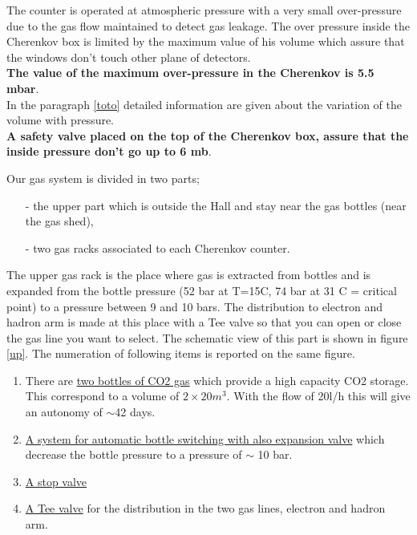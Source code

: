 \documentclass[12pt]{article}
\begin{document}

The counter is operated at atmospheric pressure with a very small
over-pressure due to the gas flow maintained to detect gas leakage. 
The over pressure inside the Cherenkov box is limited by the maximum value
of his volume which assure that the windows don't touch other plane
of detectors.\\ 
{\bf The value of the maximum over-pressure in the Cherenkov is 5.5 mbar}.\\
In the paragraph \ref{toto} detailed information are given about the
 variation of the volume with pressure.\\
{\bf A safety valve placed on the top of the
Cherenkov box, assure that the inside pressure don't go up to 6 mb}.

\label{upi}
Our gas system is divided in two parts; 
\begin{itemize}
\item[-] the upper part which is outside the Hall and stay near the gas 
bottles (near the gas shed),
\item[-] two gas racks associated to each Cherenkov counter.
\end{itemize}
The upper gas rack is the place where gas is extracted from bottles and is
 expanded from the bottle pressure (52 bar at T=15C, 74 bar at 31 C 
= critical point) to a pressure between 9 and 10 bars. The distribution to 
electron and hadron arm is made at this place with a Tee valve so that you
can open or close the gas line you want to select. The schematic view of this
part is shown  in figure \ref{up}. The numeration of following items is 
reported on the same figure.
\begin{enumerate}
\item There are \underline{two bottles of CO2 gas} 
which provide a high capacity CO2 storage. This correspond to a volume 
of $2\times 20m^3$. With the flow of 20l/h  this will give an autonomy 
of $\sim$42 days.
\item \underline{A system for automatic bottle switching with also expansion 
valve} which decrease the bottle pressure to a pressure of $\sim$ 10 bar.
\item \underline{A stop valve}
\item \underline{A Tee valve} for the distribution in the two gas lines, 
electron and hadron arm.
\end{enumerate}
\end{document}
